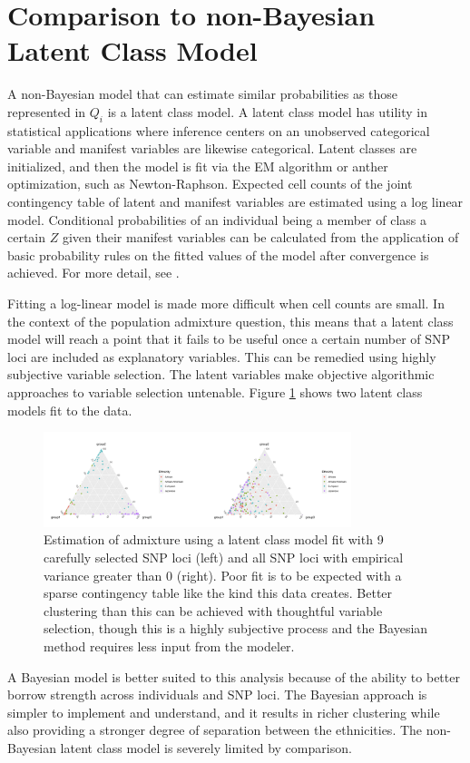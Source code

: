 \documentclass{article}
\begin{document}
\section{Comparison to non-Bayesian Latent Class Model}\label{sec:frequentist}

A non-Bayesian model that can estimate similar probabilities as those represented in $Q_i$ is a latent class model. A latent class model has utility in statistical applications where inference centers on an unobserved categorical variable and manifest variables are likewise categorical. Latent classes are initialized, and then the model is fit via the EM algorithm or anther optimization, such as Newton-Raphson. Expected cell counts of the joint contingency table of latent and manifest variables are estimated using a log linear model. Conditional probabilities of an individual being a member of class a certain $Z$ given their manifest variables can be calculated from the application of basic probability rules on the fitted values of the model after convergence is achieved. For more detail, see \cite{agresti2003CDA}.

Fitting a log-linear model is made more difficult when cell counts are small. In the context of the population admixture question, this means that a latent class model will reach a point that it fails to be useful once a certain number of SNP loci are included as explanatory variables. This can be remedied using highly subjective variable selection. The latent variables make objective algorithmic approaches to variable selection untenable. Figure \ref{fig:non-bayesian} shows two latent class models fit to the data.

\begin{figure}[h]
    \centering
    \includegraphics[width=0.8\textwidth]{SemesterProject/nonbayesian_method.png}
    \caption{Estimation of admixture using a latent class model fit with 9 carefully selected SNP loci (left) and all SNP loci with empirical variance greater than 0 (right). Poor fit is to be expected with a sparse contingency table like the kind this data creates. Better clustering than this can be achieved with thoughtful variable selection, though this is a highly subjective process and the Bayesian method requires less input from the modeler.}
    \label{fig:non-bayesian}
\end{figure}

A Bayesian model is better suited to this analysis because of the ability to better borrow strength across individuals and SNP loci. The Bayesian approach is simpler to implement and understand, and it results in richer clustering while also providing a stronger degree of separation between the ethnicities. The non-Bayesian latent class model is severely limited by comparison.



\end{document}
